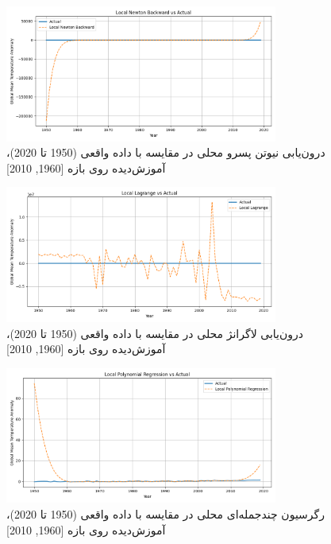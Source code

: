 \begin{figure}[htbp]
    \centering
    \includegraphics[width=0.8\textwidth]{../figs/Local_Newton_Backward_vs_actual[1960, 2010, 1].png}
    \caption{درون‌یابی نیوتن پسرو محلی در مقایسه با داده واقعی (1950 تا 2020)، آموزش‌دیده روی بازه [1960, 2010]}
    \label{fig:backward2}
\end{figure}

\begin{figure}[htbp]
    \centering
    \includegraphics[width=0.8\textwidth]{../figs/Local_Lagrange_vs_actual[1960, 2010, 1].png}
    \caption{درون‌یابی لاگرانژ محلی در مقایسه با داده واقعی (1950 تا 2020)، آموزش‌دیده روی بازه [1960, 2010]}
    \label{fig:lagrange2}
\end{figure}

\begin{figure}[htbp]
    \centering
    \includegraphics[width=0.8\textwidth]{../figs/Local_Polynomial_Regression_vs_actual[1960, 2010, 1].png}
    \caption{رگرسیون چندجمله‌ای محلی در مقایسه با داده واقعی (1950 تا 2020)، آموزش‌دیده روی بازه [1960, 2010]}
    \label{fig:regression2}
\end{figure}

